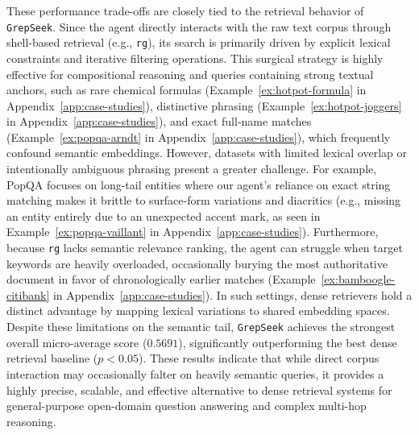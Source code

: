 \documentclass{llmxive}
\providecommand{\ourmethod}{\texttt{GrepSeek}\xspace}
\begin{document}
These performance trade-offs are closely tied to the retrieval behavior of \ourmethod{}. Since the agent directly interacts with the raw text corpus through shell-based retrieval (e.g., \texttt{rg}), its search is primarily driven by explicit lexical constraints and iterative filtering operations. This surgical strategy is highly effective for compositional reasoning and queries containing strong textual anchors, such as rare chemical formulas (Example~\ref{ex:hotpot-formula}  in Appendix~\ref{app:case-studies}), distinctive phrasing (Example~\ref{ex:hotpot-joggers} in Appendix~\ref{app:case-studies}), and exact full-name matches (Example~\ref{ex:popqa-arndt} in Appendix~\ref{app:case-studies}), which frequently confound semantic embeddings. However, datasets with limited lexical overlap or intentionally ambiguous phrasing present a greater challenge. For example, PopQA focuses on long-tail entities where our agent's reliance on exact string matching makes it brittle to surface-form variations and diacritics (e.g., missing an entity entirely due to an unexpected accent mark, as seen in Example~\ref{ex:popqa-vaillant} in Appendix~\ref{app:case-studies}). Furthermore, because \texttt{rg} lacks semantic relevance ranking, the agent can struggle when target keywords are heavily overloaded, occasionally burying the most authoritative document in favor of chronologically earlier matches (Example~\ref{ex:bamboogle-citibank} in Appendix~\ref{app:case-studies}). In such settings, dense retrievers hold a distinct advantage by mapping lexical variations to shared embedding spaces. Despite these limitations on the semantic tail, \ourmethod{} achieves the strongest overall micro-average score ($0.5691$), significantly outperforming the best dense retrieval baseline ($p < 0.05$). These results indicate that while direct corpus interaction may occasionally falter on heavily semantic queries, it provides a highly precise, scalable, and effective alternative to dense retrieval systems for general-purpose open-domain question answering and complex multi-hop reasoning.
\end{document}
